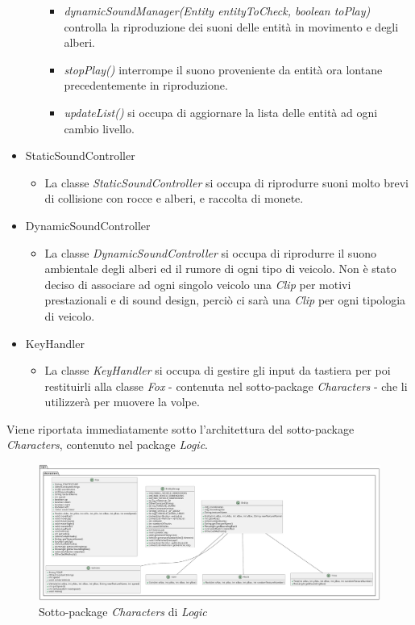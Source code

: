 \documentclass[12pt,a4paper]{report}
\begin{document}
\begin{itemize}
\begin{itemize}
\begin{itemize}
			\item \emph{dynamicSoundManager(Entity entityToCheck, boolean toPlay)} controlla la riproduzione dei suoni delle entità in movimento e degli alberi.
			\item \emph{stopPlay()} interrompe il suono proveniente da entità ora lontane precedentemente in riproduzione.
			\item \emph{updateList()} si occupa di aggiornare la lista delle entità ad ogni cambio livello.
		\end{itemize}
	\end{itemize}
	\item StaticSoundController
	\begin{itemize}
		\item La classe \emph{StaticSoundController} si occupa di riprodurre suoni molto brevi di collisione con rocce e alberi, e raccolta di monete.
	\end{itemize}
	\item DynamicSoundController
	\begin{itemize}
		\item La classe \emph{DynamicSoundController} si occupa di riprodurre il suono ambientale degli alberi ed il rumore di ogni tipo di veicolo. Non è stato deciso di associare ad ogni singolo veicolo una \emph{Clip} per motivi prestazionali e di sound design, perciò ci sarà una \emph{Clip} per ogni tipologia di veicolo.
	\end{itemize}
	\item KeyHandler
	\begin{itemize}
		\item La classe \emph{KeyHandler} si occupa di gestire gli input da tastiera per poi restituirli alla classe \emph{Fox} - contenuta nel sotto-package \emph{Characters} - che li utilizzerà per muovere la volpe.
	\end{itemize}
\end{itemize}

Viene riportata immediatamente sotto l'architettura del sotto-package \emph{Characters}, contenuto nel package \emph{Logic}.
\begin{figure}[H]
	\centering
	\includegraphics[width=1\textwidth]{Characters.pdf}
	\caption{Sotto-package \emph{Characters} di \emph{Logic}}
	\label{fig:Characters}
\end{figure}
\end{document}
